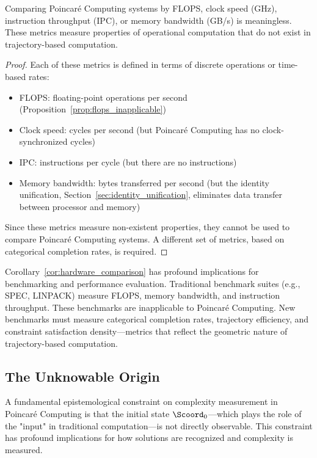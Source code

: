 \begin{corollary}
\label{cor:hardware_comparison}
Comparing Poincaré Computing systems by FLOPS, clock speed (GHz), instruction throughput (IPC), or memory bandwidth (GB/s) is meaningless. These metrics measure properties of operational computation that do not exist in trajectory-based computation.
\end{corollary}

\begin{proof}
Each of these metrics is defined in terms of discrete operations or time-based rates:
\begin{itemize}
    \item FLOPS: floating-point operations per second (Proposition~\ref{prop:flops_inapplicable})
    \item Clock speed: cycles per second (but Poincaré Computing has no clock-synchronized cycles)
    \item IPC: instructions per cycle (but there are no instructions)
    \item Memory bandwidth: bytes transferred per second (but the identity unification, Section~\ref{sec:identity_unification}, eliminates data transfer between processor and memory)
\end{itemize}

Since these metrics measure non-existent properties, they cannot be used to compare Poincaré Computing systems. A different set of metrics, based on categorical completion rates, is required.
\end{proof}

\begin{remark}
\label{rem:benchmarking}
Corollary~\ref{cor:hardware_comparison} has profound implications for benchmarking and performance evaluation. Traditional benchmark suites (e.g., SPEC, LINPACK) measure FLOPS, memory bandwidth, and instruction throughput. These benchmarks are inapplicable to Poincaré Computing. New benchmarks must measure categorical completion rates, trajectory efficiency, and constraint satisfaction density—metrics that reflect the geometric nature of trajectory-based computation.
\end{remark}

\subsection{The Unknowable Origin}

A fundamental epistemological constraint on complexity measurement in Poincaré Computing is that the initial state $\Scoord_0$—which plays the role of the "input" in traditional computation—is not directly observable. This constraint has profound implications for how solutions are recognized and complexity is measured.

